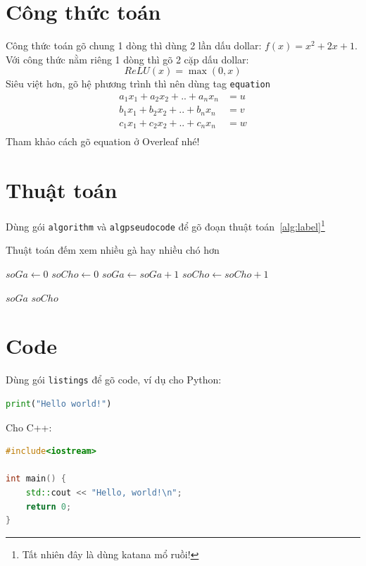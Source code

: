 \documentclass[12pt]{article}
\begin{document}
\section{Công thức toán}
Công thức toán gõ chung 1 dòng thì dùng 2 lần dấu dollar: $f(x) = x^2 + 2x + 1$. Với công thức nằm riêng 1 dòng thì gõ 2 cặp dấu dollar:
$$
ReLU(x) = \max(0, x)
$$
Siêu việt hơn, gõ hệ phương trình thì nên dùng tag \texttt{equation}
\begin{equation*}
\begin{aligned}
a_1x_1 + a_2x_2 + .. + a_nx_n &= u \\
b_1x_1 + b_2x_2 + .. + b_nx_n &= v \\
c_1x_1 + c_2x_2 + .. + c_nx_n &= w \\
\end{aligned}
\end{equation*}
Tham khảo cách gõ equation ở Overleaf nhé!

\section{Thuật toán}
Dùng gói \texttt{algorithm} và \texttt{algpseudocode} để gõ đoạn thuật toán~\ref{alg:label}\footnote{Tất nhiên đây là dùng katana mổ ruồi!}

\begin{algorithm}
\caption{Thuật toán đếm xem nhiều gà hay nhiều chó hơn}
\label{alg:label}
\begin{algorithmic}
\State $soGa \gets 0$
\State $soCho \gets 0$
\State $soGa \gets soGa + 1$
\EndFor
{}
\State $soCho \gets soCho + 1$
\EndFor

\State\Return $soGa$
\EndIf
\State\Return $soCho$
\EndFunction
\end{algorithmic}
\end{algorithm}

\section{Code}
Dùng gói \texttt{listings} để gõ code, ví dụ cho Python:

\begin{lstlisting}[language=Python]
print("Hello world!")
\end{lstlisting}

\noindent Cho C++:
\begin{lstlisting}[language=C++]
#include<iostream>

int main() {
    std::cout << "Hello, world!\n";
    return 0;
}
\end{lstlisting}
\cleardoublepage
{}
{}


\end{document}

